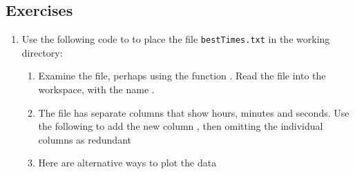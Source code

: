 \subsection{Exercises}\label{ss:ch2ex}

\begin{enumerate}
\item Use the following code to to place the file 
\texttt{bestTimes.txt} in the working directory:

\begin{enumerate}
\item  Examine the file, perhaps using the function .
Read the file into the workspace, with the name .
\begin{knitrout}
\color{fgcolor}\begin{kframe}
\begin{alltt}
 \hlkwb{<-} \hlstd{(}\hlstd{)}
\end{alltt}
\end{kframe}
\end{knitrout}
\item The  file has separate columns that show hours,
  minutes and seconds.  Use the following to add the new column
  , then omitting the individual columns as redundant
\begin{knitrout}
\color{fgcolor}\begin{kframe}
\begin{alltt}
\hlopt{$} \hlkwb{<-} 
                       \hlopt{*} \hlopt{+}  \hlopt{+} \hlopt{/}\hlstd{)}
\hlstd{(bestTimes)[}\hlopt{:}\hlstd{]}   
 \hlkwb{<-} \hlstd{bestTimes[,} \hlopt{-}\hlstd{(}\hlopt{:}\hlstd{)]}
\end{alltt}
\end{kframe}
\end{knitrout}
\item Here are alternative ways to plot the data
\begin{knitrout}
\color{fgcolor}\begin{kframe}

\end{kframe}
\end{knitrout}
\end{enumerate}
\end{enumerate}
